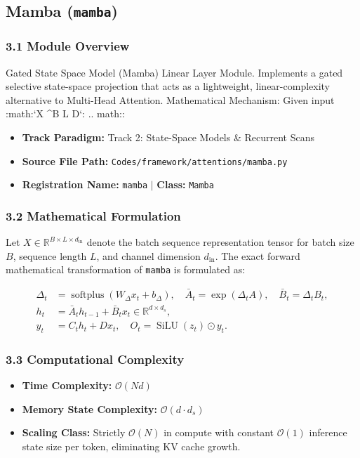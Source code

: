 \subsection{Mamba (\texttt{mamba})}
\label{sec:app_module_mamba}

\subsubsection*{3.1 Module Overview}
Gated State Space Model (Mamba) Linear Layer Module.  Implements a gated selective state-space projection that acts as a lightweight, linear-complexity alternative to Multi-Head Attention.  Mathematical Mechanism:     Given input :math:`X \in {}^{B \times L \times D}`:      .. math::
\begin{itemize}
    \item \textbf{Track Paradigm:} Track 2: State-Space Models & Recurrent Scans
    \item \textbf{Source File Path:} \texttt{Codes/framework/attentions/mamba.py}
    \item \textbf{Registration Name:} \texttt{mamba} $\mid$ \textbf{Class:} \texttt{Mamba}
\end{itemize}

\subsubsection*{3.2 Mathematical Formulation}
Let $X \in \mathbb{R}^{B \times L \times d_{\text{in}}}$ denote the batch sequence representation tensor for batch size $B$, sequence length $L$, and channel dimension $d_{\text{in}}$. The exact forward mathematical transformation of \texttt{mamba} is formulated as:

\begin{align}
\Delta_t &= \operatorname{softplus}(W_\Delta x_t + b_\Delta), \quad \bar{A}_t = \exp(\Delta_t A), \quad \bar{B}_t = \Delta_t B_t, \\
h_t &= \bar{A}_t h_{t-1} + \bar{B}_t x_t \in \mathbb{R}^{d \times d_s}, \\
y_t &= C_t h_t + D x_t, \quad O_t = \operatorname{SiLU}(z_t) \odot y_t.
\end{align}


\subsubsection*{3.3 Computational Complexity}
\begin{itemize}
    \item \textbf{Time Complexity:} $\mathcal{O}(N d)$
    \item \textbf{Memory State Complexity:} $\mathcal{O}(d \cdot d_s)$
    \item \textbf{Scaling Class:} Strictly $\mathcal{O}(N)$ in compute with constant $\mathcal{O}(1)$ inference state size per token, eliminating KV cache growth.
\end{itemize}

